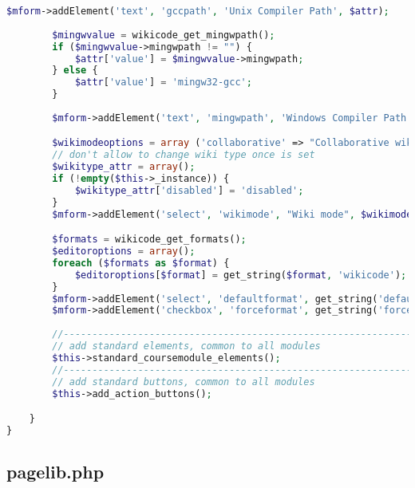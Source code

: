 \begin{lstlisting}[language=PHP]
		$mform->addElement('text', 'gccpath', 'Unix Compiler Path', $attr);
		
		$mingwvalue = wikicode_get_mingwpath();
		if ($mingwvalue->mingwpath != "") {
		    $attr['value'] = $mingwvalue->mingwpath;
		} else {
			$attr['value'] = 'mingw32-gcc';
		}
	
		$mform->addElement('text', 'mingwpath', 'Windows Compiler Path', $attr);

        $wikimodeoptions = array ('collaborative' => "Collaborative wiki", 'individual' => "Individual wiki");
        // don't allow to change wiki type once is set
        $wikitype_attr = array();
        if (!empty($this->_instance)) {
            $wikitype_attr['disabled'] = 'disabled';
        }
        $mform->addElement('select', 'wikimode', "Wiki mode", $wikimodeoptions, $wikitype_attr);

        $formats = wikicode_get_formats();
        $editoroptions = array();
        foreach ($formats as $format) {
            $editoroptions[$format] = get_string($format, 'wikicode');
        }
        $mform->addElement('select', 'defaultformat', get_string('defaultformat', 'wikicode'), $editoroptions);
        $mform->addElement('checkbox', 'forceformat', get_string('forceformat', 'wikicode'));
	
        //-------------------------------------------------------------------------------
        // add standard elements, common to all modules
        $this->standard_coursemodule_elements();
        //-------------------------------------------------------------------------------
        // add standard buttons, common to all modules
        $this->add_action_buttons();

    }
}
\end{lstlisting}

\subsection{pagelib.php}


